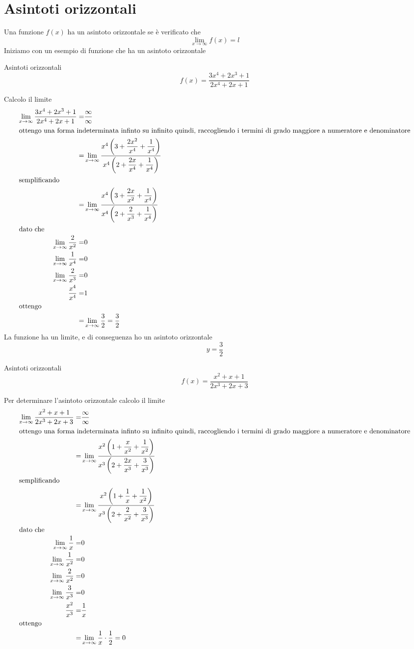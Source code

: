 \section{Asintoti orizzontali}
Una funzione $f(x)$ ha un asintoto orizzontale se è verificato che \[\lim_{x\to \infty}f(x)=l \]
Iniziamo con un esempio di funzione che ha un asintoto orizzontale
\begin{esempiot}{Asintoti orizzontali}{}
	\[f(x)=\dfrac{3x^4+2x^3+1}{2x^4+2x+1}\]
\end{esempiot}
Calcolo il limite
\begin{align*}\index{Forma!indeterminata!infinito su infinito}
\lim_{x\to \infty}\dfrac{3x^4+2x^3+1}{2x^4+2x+1}=&\dfrac{\infty}{\infty}\\
\intertext{ottengo una forma indeterminata infinto su infinito quindi, raccogliendo i termini di grado maggiore a numeratore e denominatore}
=&\lim_{x\to \infty}\dfrac{x^4\left(3+\dfrac{2x^2}{x^4}+\dfrac{1}{x^4}\right)}{x^4\left(2+\dfrac{2x}{x^4}+\dfrac{1}{x^4}\right)}\\
\intertext{semplificando}
=&\lim_{x\to \infty}\dfrac{x^4\left(3+\dfrac{2x}{x^2}+\dfrac{1}{x^4}\right)}{x^4\left(2+\dfrac{2}{x^3}+\dfrac{1}{x^4}\right)}\\
\intertext{dato che}
\lim_{x\to \infty}\dfrac{2}{x^2}=&0\\
\lim_{x\to \infty}\dfrac{1}{x^4}=&0\\
\lim_{x\to \infty}\dfrac{2}{x^3}=&0\\
\dfrac{x^4}{x^4}=&1\\
\intertext{ottengo}
=&\lim_{x\to \infty}\dfrac{3}{2}=\dfrac{3}{2}\\
\end{align*}
La funzione ha un limite, e di conseguenza ho un asintoto orizzontale\[y=\dfrac{3}{2}\]  
\begin{esempiot}{Asintoti orizzontali}{}
	\[f(x)=\dfrac{x^2+x+1}{2x^3+2x+3}\]
\end{esempiot}
Per determinare l'asintoto orizzontale calcolo il limite 
\begin{align*}\index{Forma!indeterminata!infinito su infinito}
\lim_{x\to \infty}\dfrac{x^2+x+1}{2x^3+2x+3}=&\dfrac{\infty}{\infty}\\
\intertext{ottengo una forma indeterminata infinto su infinito quindi, raccogliendo i termini di grado maggiore a numeratore e denominatore}
=&\lim_{x\to \infty}\dfrac{x^2\left(1+\dfrac{x}{x^2}+\dfrac{1}{x^2}\right)}{x^3\left(2+\dfrac{2x}{x^3}+\dfrac{3}{x^3}\right)}\\
\intertext{semplificando}
=&\lim_{x\to \infty}\dfrac{x^2\left(1+\dfrac{1}{x}+\dfrac{1}{x^2}\right)}{x^3\left(2+\dfrac{2}{x^2}+\dfrac{3}{x^3}\right)}\\
\intertext{dato che}
\lim_{x\to \infty}\dfrac{1}{x}=&0\\
\lim_{x\to \infty}\dfrac{1}{x^2}=&0\\
\lim_{x\to \infty}\dfrac{2}{x^2}=&0\\
\lim_{x\to \infty}\dfrac{3}{x^3}=&0\\
\dfrac{x^2}{x^3}=&\dfrac{1}{x}\\
\intertext{ottengo}
=&\lim_{x\to \infty}\dfrac{1}{x}\cdot\dfrac{1}{2}=0\\
\end{align*}
